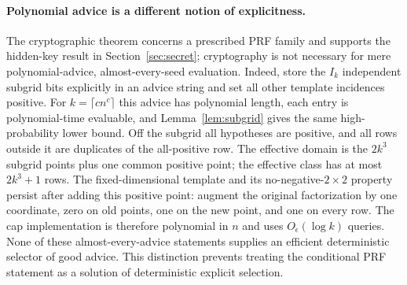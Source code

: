 \paragraph{Polynomial advice is a different notion of explicitness.}
The cryptographic theorem concerns a prescribed PRF family and supports the hidden-key result in Section~\ref{sec:secret}; cryptography is not necessary for mere polynomial-advice, almost-every-seed evaluation. Indeed, store the $I_k$ independent subgrid bits explicitly in an advice string and set all other template incidences positive. For $k=\lceil cn^c\rceil$ this advice has polynomial length, each entry is polynomial-time evaluable, and Lemma~\ref{lem:subgrid} gives the same high-probability lower bound. Off the subgrid all hypotheses are positive, and all rows outside it are duplicates of the all-positive row. The effective domain is the $2k^3$ subgrid points plus one common positive point; the effective class has at most $2k^3+1$ rows. The fixed-dimensional template and its no-negative-$2\times2$ property persist after adding this positive point: augment the original factorization by one coordinate, zero on old points, one on the new point, and one on every row. The cap implementation is therefore polynomial in $n$ and uses $O_\epsilon(\log k)$ queries. None of these almost-every-advice statements supplies an efficient deterministic selector of good advice. This distinction prevents treating the conditional PRF statement as a solution of deterministic explicit selection.
